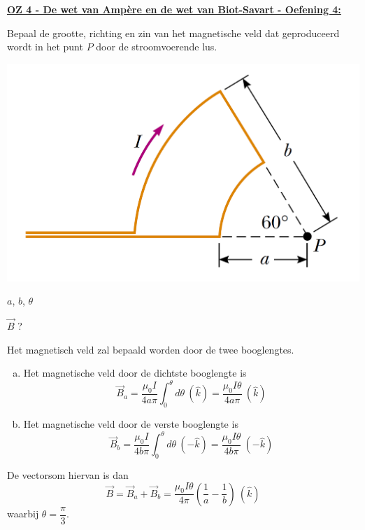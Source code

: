 \textbf{\underline{OZ 4 - De wet van Ampère en de wet van Biot-Savart - Oefening 4:}}
\vspace{0.5cm}

Bepaal de grootte, richting en zin van het magnetische veld dat geproduceerd wordt
in het punt $P$ door de stroomvoerende lus.

\begin{center}
    \includegraphics[scale = 0.3]{oz04/resources/Oz4Oef4.png}
\end{center}


\begin{description}[labelwidth=1.5cm, leftmargin=!]
    \item[Geg. :]  $a$, $b$, $\theta$
    \item[Gevr. :] $\Vec{B}$ ?
    \item[Opl. :]  
    Het magnetisch veld zal bepaald worden door de twee booglengtes. 
    \begin{enumerate}[(a)]
        \item 
        Het magnetische veld door de dichtste booglengte is
        \begin{equation*}
            \Vec{B}_a = \frac{\mu_0I}{4a\pi}\int_0^{\theta}d\theta \ (\hat{k}) = \frac{\mu_0I\theta}{4a\pi} \ (\hat{k})
        \end{equation*}
        \item 
        Het magnetische veld door de verste booglengte is
        \begin{equation*}
            \Vec{B}_b = \frac{\mu_0I}{4b\pi}\int_0^{\theta}d\theta \ (-\hat{k}) = \frac{\mu_0I\theta}{4b\pi} \ (-\hat{k})
        \end{equation*}
    \end{enumerate}
    De vectorsom hiervan is dan
    \begin{equation*}
        \Vec{B} = \Vec{B}_a + \Vec{B}_b = \frac{\mu_0I\theta}{4\pi}\left(\frac{1}{a}-\frac{1}{b}\right) \ (\hat{k})
    \end{equation*}
    waarbij $\theta = \dfrac{\pi}{3}$.
\end{description}

\vspace{1cm}